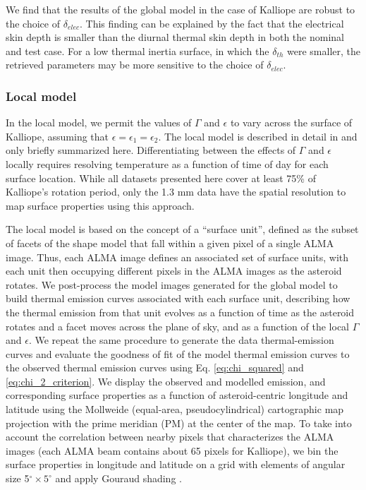 \documentclass[]{aastex631}
\begin{document}
We find that the results of the global model in the case of Kalliope are robust to the choice of $\delta_{elec}$. This finding can be explained by the fact that the electrical skin depth is smaller than the diurnal thermal skin depth in both the nominal and test case. For a low thermal inertia surface, in which the $\delta_{th}$ were smaller, the retrieved parameters may be more sensitive to the choice of $\delta_{elec}$.

\subsubsection{Local model}
\label{sec:local_TPM}

In the local model, we permit the values of $\Gamma$ and $\epsilon$ to vary across the surface of Kalliope, assuming that $\epsilon = \epsilon_1= \epsilon_2$. The local model is described in detail in \citet{cambioni2022} and only briefly summarized here. Differentiating between the effects of $\Gamma$ and $\epsilon$ locally requires resolving temperature as a function of time of day for each surface location. While all datasets presented here cover at least 75\% of Kalliope's rotation period, only the 1.3 mm data have the spatial resolution to map surface properties using this approach.

The local model is based on the concept of a “surface unit”, defined as the subset of facets of the shape model that fall within a given pixel of a single ALMA image. Thus, each ALMA image defines an associated set of surface units, with each unit then occupying different pixels in the ALMA images as the asteroid rotates. We post-process the model images generated for the global model to build thermal emission curves associated with each surface unit, describing how the thermal emission from that unit evolves as a function of time as the asteroid rotates and a facet moves across the plane of sky, and as a function of the local $\Gamma$ and $\epsilon$. We repeat the same procedure to generate the data thermal-emission curves and evaluate the goodness of fit of the model thermal emission curves to the observed thermal emission curves using Eq. \ref{eq:chi_squared} and \ref{eq:chi_2_criterion}. We display the observed and modelled emission, and corresponding surface properties as a function of asteroid-centric longitude and latitude using the Mollweide (equal-area, pseudocylindrical) cartographic map projection with the prime meridian (PM) at the center of the map. To take into account the correlation between nearby pixels that characterizes the ALMA images (each ALMA beam contains about 65 pixels for Kalliope), we bin the surface properties in longitude and latitude on a grid with elements of angular size 5$^\circ\times 5^\circ$ and apply Gouraud shading \citep{gouraud1971continuous}. 
\end{document}
